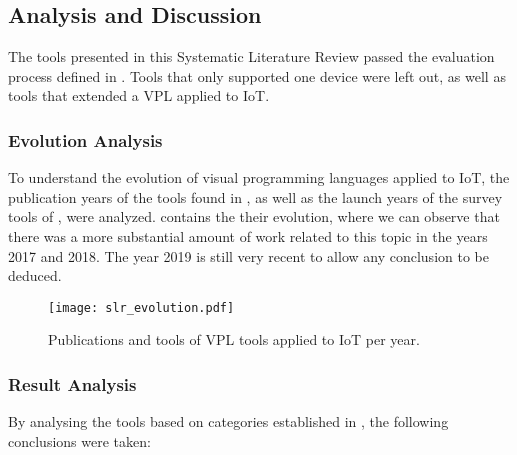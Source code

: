 \subsection{Analysis and Discussion}\label{sec:slr_discussion}

The tools presented in this Systematic Literature Review passed the evaluation process defined in . Tools that only supported one device were left out, as well as tools that extended a VPL applied to IoT. 

\subsubsection{Evolution Analysis}\label{sec:articles_nr_analysis}

To understand the evolution of visual programming languages applied to IoT, the publication years of the tools found in , as well as the launch years of the survey tools of , were analyzed.  contains the their evolution, where we can observe that there was a more substantial amount of work related to this topic in the years 2017 and 2018. The year 2019 is still very recent to allow any conclusion to be deduced.

\begin{figure}[h]
\centering
\texttt{[image: slr\_evolution.pdf]}
\caption{Publications and tools of VPL tools applied to IoT per year.}\label{fig:slr_evolution}
\end{figure}

\subsubsection{Result Analysis}\label{sec:result_analysis}

By analysing the tools based on categories established in , the following conclusions were taken:

